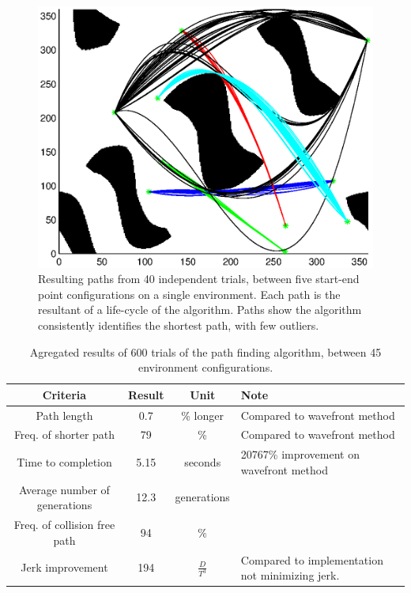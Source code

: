 \begin{figure}[h]
	\centering
	\includegraphics[width=\figWidth]{./figures/results_cSpace4.eps}
	\caption{Resulting paths from 40 independent trials, between five start-end point configurations on a single environment. Each path is the resultant of a life-cycle of the algorithm. Paths show the algorithm consistently identifies the shortest path, with few outliers.}
	\label{fig:res600}
\end{figure}

\begin{table}
\renewcommand{\arraystretch}{1.3}
\caption{Agregated results of 600 trials of the path finding algorithm, between 45 environment configurations.}
\label{tbl:results}
\begin{center}
		\begin{tabular}{ c | c  c  p{2cm} }
		Criteria & Result & Unit & Note \\ \hline
		Path length & 0.7 & \% longer & Compared to wavefront method \\
		Freq. of shorter path & 79 & \% & Compared to wavefront method \\
		Time to completion & 5.15 & seconds & 20767\% improvement on wavefront method \\
		Average number of generations & 12.3 & generations & \\
		Freq. of collision free path & 94 & \% &  \\
		Jerk improvement & 194 & ${\frac{D}{T^3}}$ & Compared to implementation not minimizing jerk.\\
\end{tabular}
\end{center}
\end{table}